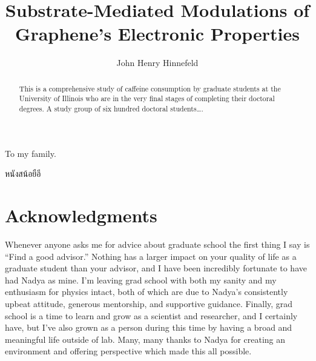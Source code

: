 \documentclass[edeposit,fullpage,draftthesis]{uiucthesis2009}
\begin{document}
\title{Substrate-Mediated Modulations of Graphene's Electronic Properties}
\author{John Henry Hinnefeld}
\phdthesis
{}
\maketitle

\frontmatter

\begin{abstract}
This is a comprehensive study of caffeine consumption by graduate
students at the University of Illinois who are in the very final
stages of completing their doctoral degrees. A study group of six
hundred doctoral students\ldots.
\end{abstract}

\begin{dedication}
To my family.

\foreignlanguage{thai}{\textthai{หนังสน้อยือี}}

\end{dedication}

\chapter*{Acknowledgments}

Whenever anyone asks me for advice about graduate school the first thing
I say is ``Find a good advisor.'' Nothing has a larger impact on your quality
of life as a graduate student than your advisor, and I have been incredibly fortunate
to have had Nadya as mine. I'm leaving grad school with both my sanity and my enthusiasm
for physics intact, both of which are due to Nadya's consistently upbeat attitude, generous mentorship,
and supportive guidance. Finally, grad school is a time to learn and 
grow as a scientist and researcher, and I certainly have, but I've also grown as a person
during this time by having a broad and meaningful life outside of lab.
Many, many thanks to Nadya for creating an environment and offering perspective 
which made this all possible.
\end{document}
